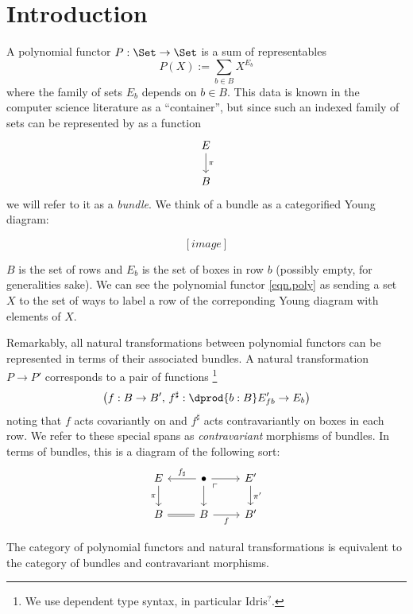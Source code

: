 
\section{Introduction}
A polynomial functor $P : \Set \to \Set$ is a sum of representables
\begin{equation}\label{eqn.poly}
P(X) := \sum_{b \in B} X^{E_b}
\end{equation}
where the family of sets $E_b$ depends on $b\in B$. This data is known
in the computer science literature as a ``container'', but since such an indexed
family of sets can be represented by as a function
\[
  \begin{tikzcd}
    E \arrow[d, "\pi"] \\
    B
  \end{tikzcd}
\]
we will refer to it as a \emph{bundle}. We think of a bundle as a categorified
Young diagram:

\[
[image]
\]

$B$ is the set of rows and $E_b$ is the set of boxes in row $b$ (possibly empty,
for generalities sake). We can see the polynomial functor \eqref{eqn.poly}
as sending a set $X$ to the set of ways to label a row of the correponding Young
diagram with elements of $X$.

Remarkably, all natural transformations between polynomial functors can be
represented in terms of their associated bundles. A natural transformation $P
\to P'$ corresponds to a pair of functions%
\footnote{We use dependent type syntax, in particular Idris$^?$.}
\[
\left( f : B \to B',\, f^{\sharp} : \dprod{b : B} E'_{fb} \to E_b \right)
\]
noting that $f$ acts covariantly on  and $f^\sharp$ acts contravariantly on
boxes in each row. We refer to these special spans as  \emph{contravariant} morphisms of bundles.
In terms of bundles, this is a diagram of the following sort:
\[
  \begin{tikzcd}
    E \arrow[d, "\pi"'] \arrow[r, leftarrow, "f_{\sharp}"] & \bullet \arrow[d] \arrow[r]
    \arrow[dr, phantom, "\ulcorner" very near start] & E' \arrow[d, "\pi'"] \\
    B \arrow[r, equals] & B \arrow[r, "f"'] & B'
  \end{tikzcd}
\]

\begin{thm}[cite]
The category of polynomial functors and natural transformations is equivalent to
the category of bundles and contravariant morphisms.
\end{thm}

